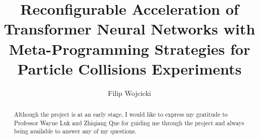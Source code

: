 \documentclass[a4paper, twoside]{report}
\title{Reconfigurable Acceleration of Transformer Neural Networks with Meta-Programming Strategies for Particle Collisions Experiments}
\author{Filip Wojcicki}
\begin{document}



\renewcommand{\abstractname}{Acknowledgements}
\begin{abstract}
Although the project is at an early stage, I would like to express my gratitude to Professor Wayne Luk and Zhiqiang Que for guiding me through the project and always being available to answer any of my questions.
\end{abstract}

{\hypersetup{linkcolor=black} \tableofcontents}







% 
% 



\end{document}

